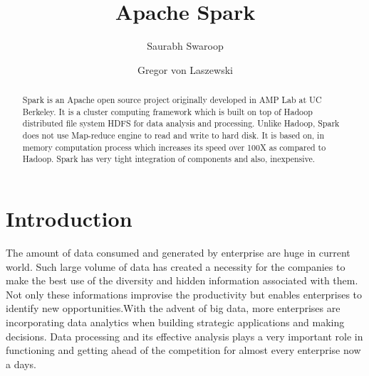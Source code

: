 
\title{Apache Spark}


\author{Saurabh Swaroop}

\author{Gregor von Laszewski}


\renewcommand{\shortauthors}{G. v. Laszewski}


\begin{abstract}

Spark is an Apache open source project originally developed in AMP Lab at UC
Berkeley. It is a cluster computing framework which is built on top of Hadoop
distributed file system HDFS for data analysis and processing. Unlike Hadoop,
Spark does not use Map-reduce engine to read and write to hard disk.
It is based on, in memory computation process which increases its speed over
100X as compared to Hadoop. Spark has very tight integration of components and
also, inexpensive.

\end{abstract}



\maketitle


\section{Introduction}

The amount of data consumed and generated by enterprise are huge in current world.
Such large volume of data has created a necessity for the companies to make the
best use of the diversity and hidden information associated with them. Not only
these informations improvise the productivity but enables enterprises to identify
new opportunities.With the advent of big data, more enterprises are incorporating
data analytics when building strategic applications and making decisions. Data
processing and its effective analysis plays a very important role in functioning
and getting ahead of the competition for almost every enterprise now a days.


